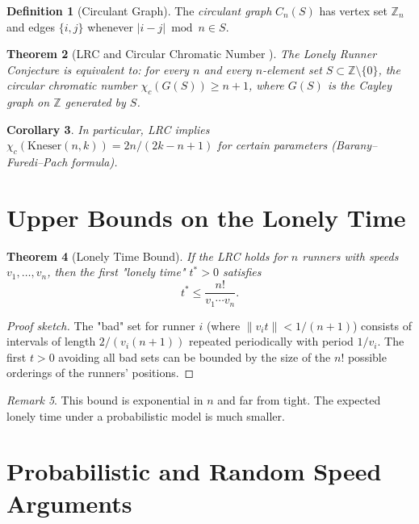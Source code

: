 \documentclass[12pt,a4paper]{amsart}
\newtheorem{theorem}{Theorem}[section]
\newtheorem{corollary}[theorem]{Corollary}
\theoremstyle{definition}
\newtheorem{definition}[theorem]{Definition}
\theoremstyle{remark}
\newtheorem{remark}[theorem]{Remark}
\newcommand{\Z}{\mathbb{Z}}
\begin{document}
\begin{definition}[Circulant Graph]
The \emph{circulant graph} $C_n(S)$ has vertex set $\Z_n$ and edges $\{i, j\}$
whenever $|i - j| \bmod n \in S$.
\end{definition}

\begin{theorem}[LRC and Circular Chromatic Number \cite{TothCayley2001}]\label{thm:circ_chrom}
The Lonely Runner Conjecture is equivalent to: for every $n$ and every
$n$-element set $S \subset \Z \setminus \{0\}$, the \emph{circular chromatic number}
$\chi_c(G(S)) \geq n+1$, where $G(S)$ is the Cayley graph on $\Z$ generated by $S$.
\end{theorem}

\begin{corollary}
In particular, LRC implies $\chi_c(\mathrm{Kneser}(n, k)) = 2n/(2k-n+1)$ for
certain parameters (Barany--Furedi--Pach formula).
\end{corollary}

\section{Upper Bounds on the Lonely Time}\label{sec:upper_bounds}

\begin{theorem}[Lonely Time Bound]\label{thm:lonely_time}
If the LRC holds for $n$ runners with speeds $v_1, \ldots, v_n$, then the first
"lonely time" $t^* > 0$ satisfies
\[
  t^* \leq \frac{n!}{v_1 \cdots v_n}.
\]
\end{theorem}

\begin{proof}[Proof sketch]
The "bad" set for runner $i$ (where $\|v_i t\| < 1/(n+1)$) consists of intervals
of length $2/(v_i(n+1))$ repeated periodically with period $1/v_i$. The first
$t > 0$ avoiding all bad sets can be bounded by the size of the $n!$ possible
orderings of the runners' positions.
\end{proof}

\begin{remark}
This bound is exponential in $n$ and far from tight. The expected lonely time
under a probabilistic model is much smaller.
\end{remark}

\section{Probabilistic and Random Speed Arguments}\label{sec:probabilistic}
\end{document}
